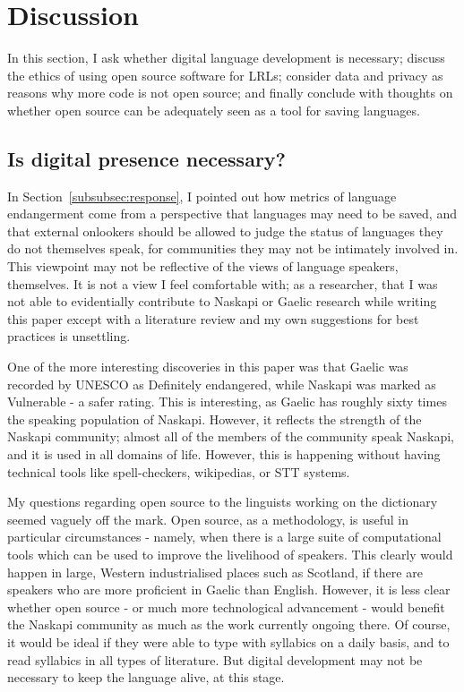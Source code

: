 \section{Discussion}
\label{sec:discussion}

In this section, I ask whether digital language development is necessary; discuss the ethics of using open source software for LRLs; consider data and privacy as reasons why more code is not open source; and finally conclude with thoughts on whether open source can be adequately seen as a tool for saving languages.

\subsection{Is digital presence necessary?}

In Section~\ref{subsubsec:response}, I pointed out how metrics of language endangerment come from a perspective that languages may need to be saved, and that external onlookers should be allowed to judge the status of languages they do not themselves speak, for communities they may not be intimately involved in. This viewpoint may not be reflective of the views of language speakers, themselves. It is not a view I feel comfortable with; as a researcher, that I was not able to evidentially contribute to Naskapi or Gaelic research while writing this paper except with a literature review and my own suggestions for best practices is unsettling.

One of the more interesting discoveries in this paper was that Gaelic was recorded by UNESCO as Definitely endangered, while Naskapi was marked as Vulnerable - a safer rating. This is interesting, as Gaelic has roughly sixty times the speaking population of Naskapi. However, it reflects the strength of the Naskapi community; almost all of the members of the community speak Naskapi, and it is used in all domains of life. However, this is happening without having technical tools like spell-checkers, wikipedias, or STT systems.

My questions regarding open source to the linguists working on the dictionary seemed vaguely off the mark. Open source, as a methodology, is useful in particular circumstances - namely, when there is a large suite of computational tools which can be used to improve the livelihood of speakers. This clearly would happen in large, Western industrialised places such as Scotland, if there are speakers who are more proficient in Gaelic than English. However, it is less clear whether open source - or much more technological advancement - would benefit the Naskapi community as much as the work currently ongoing there. Of course, it would be ideal if they were able to type with syllabics on a daily basis, and to read syllabics in all types of literature. But digital development may not be necessary to keep the language alive, at this stage.


